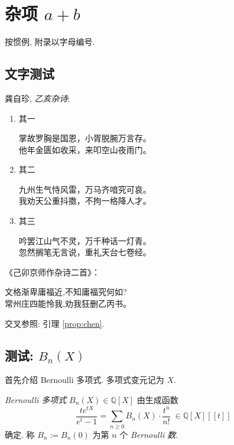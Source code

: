 \appendix
	\chapter{杂项 \texorpdfstring{$a+b$}{a+b}}
	按惯例, 附录以字母编号.
	
	\section{文字测试}
	龚自珍, \emph{乙亥杂诗}:
	\begin{enumerate}
		\item 其一
		\begin{center}
			掌故罗胸是国恩，小胥脱腕万言存。\\
			他年金匮如收采，来叩空山夜雨门。
		\end{center}
		\item 其二
		\begin{center}
			九州生气恃风雷，万马齐喑究可哀。\\
			我劝天公重抖擞，不拘一格降人才。
		\end{center}
		\item 其三
		\begin{center}
			吟罢江山气不灵，万千种话一灯青。\\
			忽然搁笔无言说，重礼天台七卷经。
		\end{center}
	\end{enumerate}	

	\begin{definition-theorem}[龚自珍]
		 《己卯京师作杂诗二首》：
		 \begin{center}
		 	文格渐卑庸福近,不知庸福究何如? \\
		 	常州庄四能怜我,劝我狂删乙丙书。
		 \end{center}
	\end{definition-theorem}

	交叉参照: 引理 \ref{prop:chen}.

	\section{测试: \texorpdfstring{$B_n(X)$}{BnX}}\label{sec:B}
	首先介绍 Bernoulli 多项式. 多项式变元记为 $X$.
	\begin{definition-proposition}
		\emph{Bernoulli 多项式} $B_n(X) \in \mathbb{Q}[X]$ 由生成函数
		\begin{equation}
			\frac{t e^{tX}}{e^t - 1} = \sum_{n \geq 0} B_n(X) \cdot \frac{t^n}{n!} \; \in \mathbb{Q}[X][\![t]\!]
		\end{equation}
		确定. 称 $B_n := B_n(0)$ 为第 $n$ 个 \emph{Bernoulli 数}.
	\end{definition-proposition}

